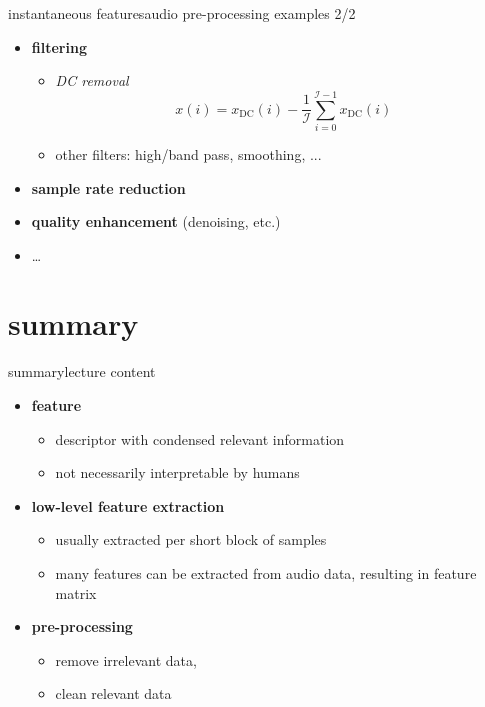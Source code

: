         \begin{frame}{instantaneous features}{audio pre-processing examples 2/2}
            \begin{itemize}
                \item   \textbf{filtering}
                    \begin{itemize}
                        \item   \textit{DC removal}
                            \[
                                x(i) = x_{\mathrm{DC}}(i) - \frac{1}{\mathcal{I}}\sum\limits_{i=0}^{\mathcal{I}-1}{x_{\mathrm{DC}}(i)} 
                            \]
                        \item   other filters: high/band pass, smoothing, ...
                    \end{itemize}
                \bigskip
                \item<2->   \textbf{sample rate reduction}
                \bigskip
                \item<3->   \textbf{quality enhancement} (denoising, etc.)
                \bigskip
                \item<3->   \ldots
            \end{itemize}
        \end{frame}
        
    \section{summary}
        \begin{frame}{summary}{lecture content}
            \begin{itemize}
                \item   \textbf{feature}
                    \begin{itemize}
                        \item   descriptor with condensed relevant information
                        \item   not necessarily interpretable by humans
                    \end{itemize}
                \bigskip
                \item   \textbf{low-level feature extraction}
                    \begin{itemize}
                        \item   usually extracted per short block of samples
                        \item   many features can be extracted from audio data, resulting in feature matrix
                    \end{itemize}
                \bigskip
                \item   \textbf{pre-processing}
                    \begin{itemize}
                        \item   remove irrelevant data,
                        \item   clean relevant data
                    \end{itemize}
            \end{itemize}
        \end{frame}

